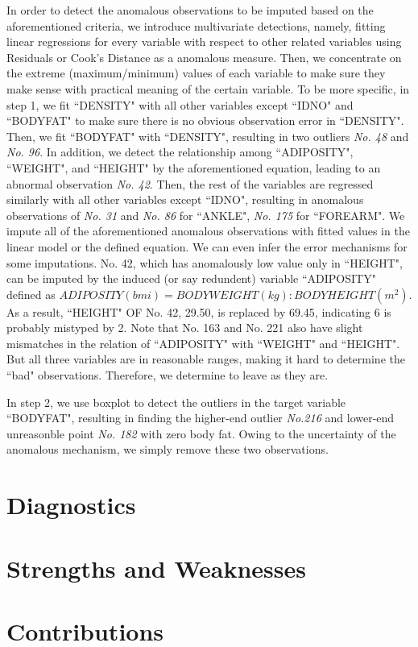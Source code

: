 \documentclass[12pt, letterpaper]{article}
\begin{document}
In order to detect the anomalous observations to be imputed based on the aforementioned criteria, we introduce multivariate detections, namely, fitting linear regressions for every variable with respect to other related variables using Residuals or Cook's Distance as a anomalous measure. Then, we concentrate on the extreme (maximum/minimum) values of each variable to make sure they make sense with practical meaning of the certain variable. To be more specific, in step 1, we fit ``DENSITY" with all other variables except ``IDNO" and ``BODYFAT" to make sure there is no obvious observation error in ``DENSITY". Then, we fit ``BODYFAT" with ``DENSITY", resulting in two outliers \emph{No. 48} and \emph{No. 96}. In addition, we detect the relationship among ``ADIPOSITY", ``WEIGHT", and ``HEIGHT" by the aforementioned equation, leading to an abnormal observation \emph{No. 42}. Then, the rest of the variables are regressed similarly with all other variables except ``IDNO", resulting in anomalous observations of \emph{No. 31} and \emph{No. 86} for ``ANKLE", \emph{No. 175} for ``FOREARM". We impute all of the aforementioned anomalous observations with fitted values in the linear model or the defined equation. We can even infer the error mechanisms for some imputations. No. 42, which has anomalously low value only in ``HEIGHT", can be imputed by the induced (or say redundent) variable ``ADIPOSITY" defined as 
$ADIPOSITY(bmi) = BODY WEIGHT(kg) : BODY HEIGHT(m^2).$
As a result, ``HEIGHT" OF No. 42, 29.50, is replaced by 69.45, indicating 6 is probably mistyped by 2. Note that No. 163 and No. 221 also have slight mismatches in the relation of ``ADIPOSITY" with ``WEIGHT" and ``HEIGHT". But all three variables are in reasonable ranges, making it hard to determine the ``bad" observations. Therefore, we determine to leave as they are. 

In step 2, we use boxplot to detect the outliers in the target variable ``BODYFAT", resulting in finding the higher-end outlier \emph{No.216} and lower-end unreasonble point \emph{No. 182} with zero body fat. Owing to the uncertainty of the anomalous mechanism, we simply remove these two observations. 

\section{Diagnostics}

\section{Strengths and Weaknesses}

\section{Contributions}

\pagebreak

{\small


}
\end{document}
